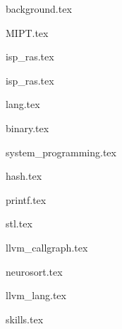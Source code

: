 \documentclass[11pt]{article}
\begin{document}

\noindent

{background.tex}


{MIPT.tex}


{isp_ras.tex}


{isp_ras.tex}




{lang.tex}

{binary.tex}

{system_programming.tex}



{hash.tex}


{printf.tex}





{stl.tex}


{llvm_callgraph.tex}

{neurosort.tex}

{llvm_lang.tex}


{skills.tex}
\end{document}
